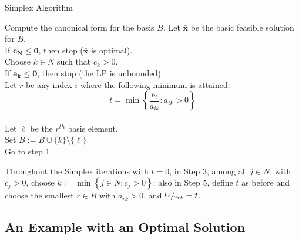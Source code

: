 \begin{algbox}
    \begin{algorithm}[H]
        \caption{Simplex Algorithm}
        Compute the canonical form for the basis $B$. Let $\bm{\bar{x}}$
        be the basic feasible solution for $ B $.\\
        If $\bm{c_N}\leqslant \bm{0}$, then stop ($\bm{\bar{x}}$ is optimal).\\
        Choose $k\in N$ such that $c_k>0$.\\
        If $\bm{a_k}\leqslant \bm{0}$, then stop (the LP is unbounded).\\
        Let $r$ be any index $ i $ where the following minimum is attained:
        \[t=\min\left\{\frac{b_i}{a_{ik}} : a_{ik}>0\right\}\]\\
        Let $\ell$ be the $r^{th}$ basis element.\\
        Set $B:=B\cup\{k\}\setminus\{\ell\}$.\\
        Go to step 1.
    \end{algorithm}
\end{algbox}

\begin{thmbox}
    \begin{theorem}
        Throughout the Simplex iterations with $ t=0 $, in Step 3, among
        all $ j\in N $, with $ c_j>0 $, choose $ k:=\min\left\{ j\in N:c_j>0\right\} $;
        also in Step 5, define $ t $ as before and choose the smallest
        $ r\in B $ with $ a_{rk}>0 $, and $ \sfrac{b_r}{a_{rk}}=t $.
    \end{theorem}
\end{thmbox}

\subsection{An Example with an Optimal Solution}

